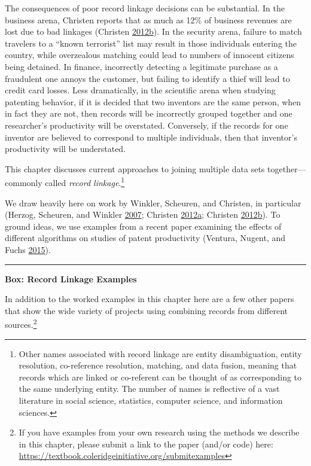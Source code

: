 \documentclass[]{krantz}
\begin{document}
The consequences of poor record linkage decisions can be substantial. In
the business arena, Christen reports that as much as 12\% of business
revenues are lost due to bad linkages (Christen
\protect\hyperlink{ref-christen2012data}{2012}\protect\hyperlink{ref-christen2012data}{b}).
In the security arena, failure to match travelers to a ``known
terrorist'' list may result in those individuals entering the country,
while overzealous matching could lead to numbers of innocent citizens
being detained. In finance, incorrectly detecting a legitimate purchase
as a fraudulent one annoys the customer, but failing to identify a thief
will lead to credit card losses. Less dramatically, in the scientific
arena when studying patenting behavior, if it is decided that two
inventors are the same person, when in fact they are not, then records
will be incorrectly grouped together and one researcher's productivity
will be overstated. Conversely, if the records for one inventor are
believed to correspond to multiple individuals, then that inventor's
productivity will be understated.

This chapter discusses current approaches to joining multiple data sets
together---commonly called \emph{record linkage}.\footnote{Other names
  associated with record linkage are entity disambiguation, entity
  resolution, co-reference resolution, matching, and data fusion,
  meaning that records which are linked or co-referent can be thought of
  as corresponding to the same underlying entity. The number of names is
  reflective of a vast literature in social science, statistics,
  computer science, and information sciences.}

We draw heavily here on work by Winkler, Scheuren, and Christen, in
particular (Herzog, Scheuren, and Winkler
\protect\hyperlink{ref-herzog2007data}{2007}; Christen
\protect\hyperlink{ref-christen2012survey}{2012}\protect\hyperlink{ref-christen2012survey}{a};
Christen
\protect\hyperlink{ref-christen2012data}{2012}\protect\hyperlink{ref-christen2012data}{b}).
To ground ideas, we use examples from a recent paper examining the
effects of different algorithms on studies of patent productivity
(Ventura, Nugent, and Fuchs
\protect\hyperlink{ref-ventura2015seeing}{2015}).

\begin{center}\rule{0.5\linewidth}{\linethickness}\end{center}

\textbf{Box: Record Linkage Examples}

In addition to the worked examples in this chapter here are a few other
papers that show the wide variety of projects using combining records
from different sources.\footnote{If you have examples from your own
  research using the methods we describe in this chapter, please submit
  a link to the paper (and/or code) here:
  \url{https://textbook.coleridgeinitiative.org/submitexamples}}
\end{document}

